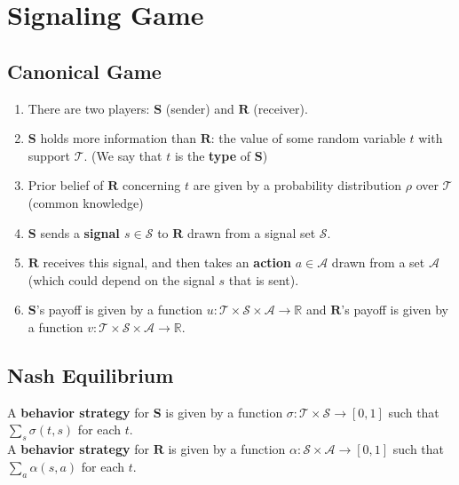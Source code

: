 \documentclass[11pt]{elegantbook_2}
\begin{document}
\section{Signaling Game}
\subsection{Canonical Game}
\begin{definition}
    \begin{enumerate}
        \item There are two players: $\mathbf{S}$ (sender) and $\mathbf{R}$ (receiver).
        \item $\mathbf{S}$ holds more information than $\mathbf{R}$: the value of some random variable $t$ with support $\mathcal{T}$. (We say that $t$ is the \textbf{type} of $\mathbf{S}$)
        \item Prior belief of $\mathbf{R}$ concerning $t$ are given by a probability distribution $\rho$ over $\mathcal{T}$ (common knowledge)
        \item $\mathbf{S}$ sends a \textbf{signal $s\in \mathcal{S}$} to $\mathbf{R}$ drawn from a signal set $\mathcal{S}$.
        \item $\mathbf{R}$ receives this signal, and then takes an \textbf{action} $a\in \mathcal{A}$ drawn from a set $\mathcal{A}$ (which could depend on the signal $s$ that is sent).
        \item $\mathbf{S}$'s payoff is given by a function $u: \mathcal{T}\times \mathcal{S} \times \mathcal{A} \rightarrow \mathbb{R}$ and $\mathbf{R}$'s payoff is given by a function $v: \mathcal{T}\times \mathcal{S} \times \mathcal{A} \rightarrow \mathbb{R}$.
    \end{enumerate}
\end{definition}

\subsection{Nash Equilibrium}
\begin{definition}[Strategy]
    A \textbf{behavior strategy} for $\mathbf{S}$ is given by a function $\sigma: \mathcal{T}\times\mathcal{S} \rightarrow [0,1]$ such that $\sum_s \sigma(t,s)$ for each $t$.\\
    A \textbf{behavior strategy} for $\mathbf{R}$ is given by a function $\alpha: \mathcal{S}\times\mathcal{A} \rightarrow [0,1]$ such that $\sum_a \alpha(s,a)$ for each $t$.
\end{definition}
\end{document}
